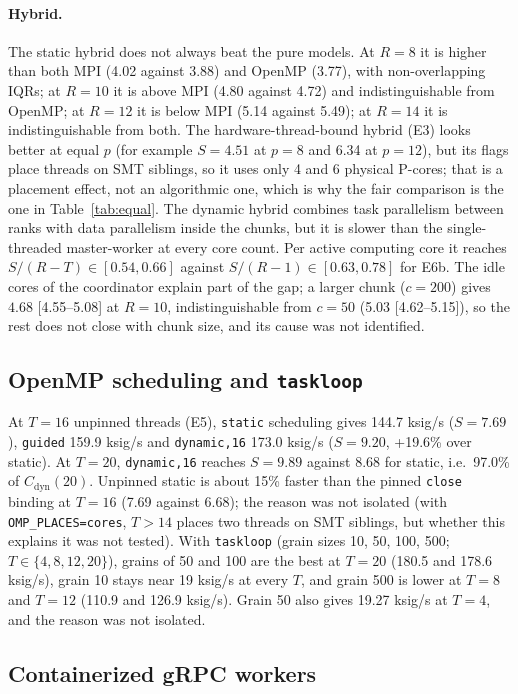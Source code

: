 \documentclass[10pt,a4paper]{article}
\begin{document}
\paragraph{Hybrid.} The static hybrid does not always beat the pure models. At $R=8$ it is higher than both MPI (4.02 against 3.88) and OpenMP (3.77), with non-overlapping IQRs; at $R=10$ it is above MPI (4.80 against 4.72) and indistinguishable from OpenMP; at $R=12$ it is below MPI (5.14 against 5.49); at $R=14$ it is indistinguishable from both. The hardware-thread-bound hybrid (E3) looks better at equal $p$ (for example $S=4.51$ at $p=8$ and 6.34 at $p=12$), but its flags place threads on SMT siblings, so it uses only 4 and 6 physical P-cores; that is a placement effect, not an algorithmic one, which is why the fair comparison is the one in Table~\ref{tab:equal}. The dynamic hybrid combines task parallelism between ranks with data parallelism inside the chunks, but it is slower than the single-threaded master-worker at every core count. Per active computing core it reaches $S/(R-T)\in[0.54,0.66]$ against $S/(R-1)\in[0.63,0.78]$ for E6b. The idle cores of the coordinator explain part of the gap; a larger chunk ($c=200$) gives $4.68$ [4.55--5.08] at $R=10$, indistinguishable from $c=50$ (5.03 [4.62--5.15]), so the rest does not close with chunk size, and its cause was not identified.

\subsection{OpenMP scheduling and \texttt{taskloop}}

At $T=16$ unpinned threads (E5), \texttt{static} scheduling gives 144.7 ksig/s ($S=7.69$), \texttt{guided} 159.9 ksig/s and \texttt{dynamic,16} 173.0 ksig/s ($S=9.20$, +19.6\% over static). At $T=20$, \texttt{dynamic,16} reaches $S=9.89$ against 8.68 for static, i.e.\ 97.0\% of $C_{\mathrm{dyn}}(20)$. Unpinned static is about 15\% faster than the pinned \texttt{close} binding at $T=16$ (7.69 against 6.68); the reason was not isolated (with \texttt{OMP\_PLACES=cores}, $T>14$ places two threads on SMT siblings, but whether this explains it was not tested). With \texttt{taskloop} (grain sizes 10, 50, 100, 500; $T\in\{4,8,12,20\}$), grains of 50 and 100 are the best at $T=20$ (180.5 and 178.6 ksig/s), grain 10 stays near 19 ksig/s at every $T$, and grain 500 is lower at $T=8$ and $T=12$ (110.9 and 126.9 ksig/s). Grain 50 also gives 19.27 ksig/s at $T=4$, and the reason was not isolated.

\subsection{Containerized gRPC workers}
\end{document}
